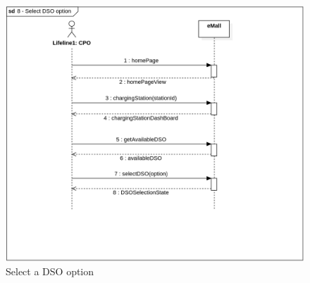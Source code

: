 \begin{figure}[H]
    \begin{center}
        \includegraphics[width=\textwidth]{img/sequence/dso.png}
        \caption{Select a DSO option}
    \end{center}
\end{figure}

